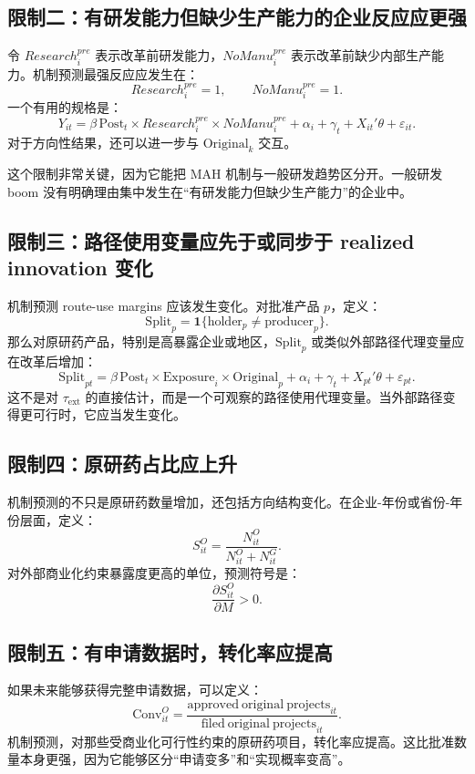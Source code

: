 \documentclass[12pt]{article}
\newcommand{\tauext}{\tau_{\mathrm{ext}}}
\newcommand{\Post}{\mathrm{Post}}
\newcommand{\Original}{\mathrm{Original}}
\newcommand{\Exposure}{\mathrm{Exposure}}
\newcommand{\Split}{\mathrm{Split}}
\newcommand{\Conv}{\mathrm{Conv}}
\newcommand{\one}{\mathbf{1}}
\begin{document}
\subsection{限制二：有研发能力但缺少生产能力的企业反应应更强}

令 $Research_i^{pre}$ 表示改革前研发能力，$NoManu_i^{pre}$ 表示改革前缺少内部生产能力。机制预测最强反应应发生在：
\[
Research_i^{pre}=1,
\qquad
NoManu_i^{pre}=1.
\]
一个有用的规格是：
\[
Y_{it}=\beta\,\Post_t\times Research_i^{pre}\times NoManu_i^{pre}
+\alpha_i+\gamma_t+X_{it}'\theta+\varepsilon_{it}.
\]
对于方向性结果，还可以进一步与 $\Original_k$ 交互。

这个限制非常关键，因为它能把 MAH 机制与一般研发趋势区分开。一般研发 boom 没有明确理由集中发生在“有研发能力但缺少生产能力”的企业中。

\subsection{限制三：路径使用变量应先于或同步于 realized innovation 变化}

机制预测 route-use margins 应该发生变化。对批准产品 $p$，定义：
\[
\Split_p=\one\{\mathrm{holder}_p\neq \mathrm{producer}_p\}.
\]
那么对原研药产品，特别是高暴露企业或地区，$\Split_p$ 或类似外部路径代理变量应在改革后增加：
\[
\Split_{pt}=\beta\,\Post_t\times \Exposure_i\times \Original_p
+\alpha_i+\gamma_t+X_{pt}'\theta+\varepsilon_{pt}.
\]
这不是对 $\tauext$ 的直接估计，而是一个可观察的路径使用代理变量。当外部路径变得更可行时，它应当发生变化。

\subsection{限制四：原研药占比应上升}

机制预测的不只是原研药数量增加，还包括方向结构变化。在企业-年份或省份-年份层面，定义：
\[
S_{it}^O=\frac{N_{it}^O}{N_{it}^O+N_{it}^G}.
\]
对外部商业化约束暴露度更高的单位，预测符号是：
\[
\frac{\partial S_{it}^O}{\partial M}>0.
\]

\subsection{限制五：有申请数据时，转化率应提高}

如果未来能够获得完整申请数据，可以定义：
\[
\Conv_{it}^O=\frac{\mathrm{approved\ original\ projects}_{it}}{\mathrm{filed\ original\ projects}_{it}}.
\]
机制预测，对那些受商业化可行性约束的原研药项目，转化率应提高。这比批准数量本身更强，因为它能够区分“申请变多”和“实现概率变高”。
\end{document}

